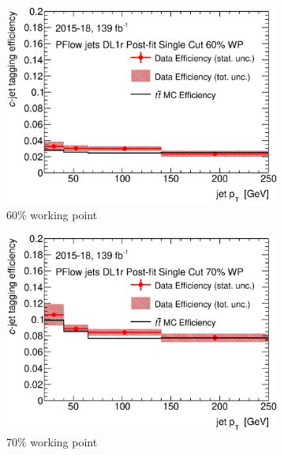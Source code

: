 \documentclass[letterpaper,12pt]{article}
\begin{document}
\begin{figure}[H]
	\centering
	\begin{subfigure}[t]{.35\linewidth}
		\includegraphics[width=1\textwidth]{FTAG_plots/DL1rallPFlowDec/eff60.eps}
		\caption{60\% working point}
			\end{subfigure}
		\begin{subfigure}[t]{.35\linewidth}
			\includegraphics[width=1\textwidth]{FTAG_plots/DL1rallPFlowDec/eff70.eps}
			\caption{70\% working point}
		\end{subfigure}
		\begin{subfigure}[t]{.35\linewidth}

\end{subfigure}
\end{figure}
\end{document}
